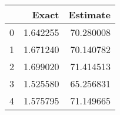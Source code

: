 \begin{tabular}{lrr}
\toprule
 & Exact & Estimate \\
\midrule
0 & 1.642255 & 70.280008 \\
1 & 1.671240 & 70.140782 \\
2 & 1.699020 & 71.414513 \\
3 & 1.525580 & 65.256831 \\
4 & 1.575795 & 71.149665 \\
\bottomrule
\end{tabular}
